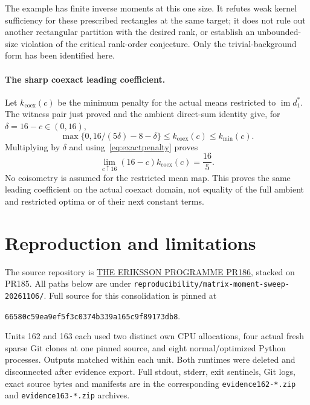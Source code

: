 \documentclass[11pt,a4paper]{article}
\newcommand{\im}{\operatorname{im}}
\begin{document}
The example has finite inverse moments at this one size. It refutes weak
kernel sufficiency for these prescribed rectangles at the same target;
it does not rule out another rectangular partition with the desired rank,
or establish an unbounded-size violation of the critical rank-order
conjecture. Only the trivial-background form has been identified here.


\paragraph{The sharp coexact leading coefficient.}
Let $k_{\mathrm{coex}}(c)$ be the minimum penalty for the actual means
restricted to $\im d_1^*$. The witness pair just proved and the ambient
direct-sum identity give, for $\delta=16-c\in(0,16)$,
\[
 \max\{0,16/(5\delta)-8-\delta\}
 \leq k_{\mathrm{coex}}(c)\leq k_{\min}(c).
\]
Multiplying by $\delta$ and using~\eqref{eq:exactpenalty} proves
\[
 \lim_{c\uparrow16}(16-c)k_{\mathrm{coex}}(c)=\frac{16}{5}.
\]
No coisometry is assumed for the restricted mean map. This proves the
same leading coefficient on the actual coexact domain, not equality of
the full ambient and restricted optima or of their next constant terms.

\section{Reproduction and limitations}\label{sec:evidence}
The source repository is
\href{https://github.com/lluiseriksson/THE-ERIKSSON-PROGRAMME/pull/186}{THE ERIKSSON PROGRAMME PR186},
stacked on PR185. All paths below are under
\texttt{reproducibility/matrix-moment-sweep-20261106/}.
Full source for this consolidation is pinned at
\begin{center}\small\texttt{66580c59ea9ef5f3c0374b339a165c9f89173db8}.\end{center}
Units 162 and 163 each used two distinct own CPU allocations, four actual
fresh sparse Git clones at one pinned source, and eight normal/optimized
Python processes. Outputs matched within each unit. Both runtimes were
deleted and disconnected after evidence export. Full stdout, stderr, exit
sentinels, Git logs, exact source bytes and manifests are in the corresponding
\texttt{evidence162-*.zip} and \texttt{evidence163-*.zip} archives.
\end{document}
